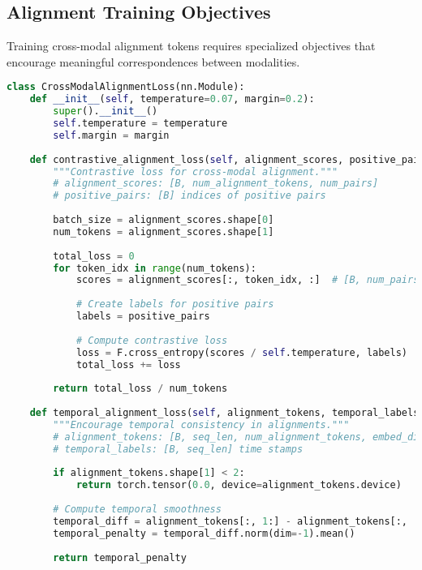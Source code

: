 \subsection{Alignment Training Objectives}

Training cross-modal alignment tokens requires specialized objectives that encourage meaningful correspondences between modalities.

\begin{lstlisting}[language=Python, caption=Cross-modal alignment training objectives]
class CrossModalAlignmentLoss(nn.Module):
    def __init__(self, temperature=0.07, margin=0.2):
        super().__init__()
        self.temperature = temperature
        self.margin = margin
        
    def contrastive_alignment_loss(self, alignment_scores, positive_pairs):
        """Contrastive loss for cross-modal alignment."""
        # alignment_scores: [B, num_alignment_tokens, num_pairs]
        # positive_pairs: [B] indices of positive pairs
        
        batch_size = alignment_scores.shape[0]
        num_tokens = alignment_scores.shape[1]
        
        total_loss = 0
        for token_idx in range(num_tokens):
            scores = alignment_scores[:, token_idx, :]  # [B, num_pairs]
            
            # Create labels for positive pairs
            labels = positive_pairs
            
            # Compute contrastive loss
            loss = F.cross_entropy(scores / self.temperature, labels)
            total_loss += loss
        
        return total_loss / num_tokens
    
    def temporal_alignment_loss(self, alignment_tokens, temporal_labels):
        """Encourage temporal consistency in alignments."""
        # alignment_tokens: [B, seq_len, num_alignment_tokens, embed_dim]
        # temporal_labels: [B, seq_len] time stamps
        
        if alignment_tokens.shape[1] < 2:
            return torch.tensor(0.0, device=alignment_tokens.device)
        
        # Compute temporal smoothness
        temporal_diff = alignment_tokens[:, 1:] - alignment_tokens[:, :-1]
        temporal_penalty = temporal_diff.norm(dim=-1).mean()
        
        return temporal_penalty
    

\end{lstlisting}
